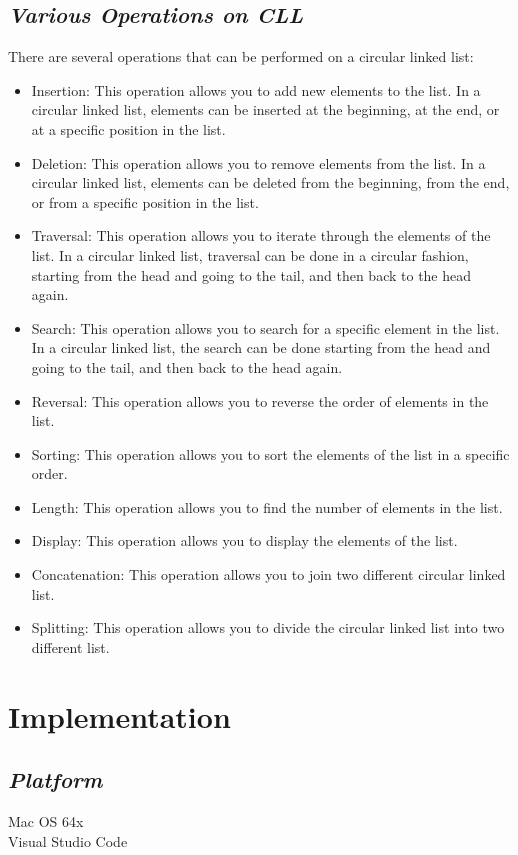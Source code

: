 \documentclass{article}
\begin{document}
\subsection{\textbf{\textit{Various Operations on CLL}}}
There are several operations that can be performed on a circular linked list:
\begin{itemize}
    \item Insertion: This operation allows you to add new elements to the list. In a circular linked list, elements can be inserted at the beginning, at the end, or at a specific position in the list.
    \item Deletion: This operation allows you to remove elements from the list. In a circular linked list, elements can be deleted from the beginning, from the end, or from a specific position in the list.
    \item Traversal: This operation allows you to iterate through the elements of the list. In a circular linked list, traversal can be done in a circular fashion, starting from the head and going to the tail, and then back to the head again.
    \item Search: This operation allows you to search for a specific element in the list. In a circular linked list, the search can be done starting from the head and going to the tail, and then back to the head again.
    \item Reversal: This operation allows you to reverse the order of elements in the list.
    \item Sorting: This operation allows you to sort the elements of the list in a specific order.
    \item Length: This operation allows you to find the number of elements in the list.
    \item Display: This operation allows you to display the elements of the list.
    \item Concatenation: This operation allows you to join two different circular linked list.
    \item Splitting: This operation allows you to divide the circular linked list into two different list.
\end{itemize}
\section{\textbf{Implementation}}
\subsection{\textbf{\textit{Platform}}}
Mac OS 64x\\
Visual Studio Code 
\end{document}
